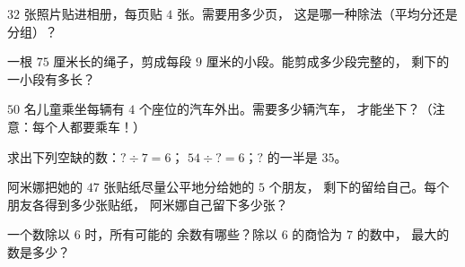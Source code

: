 \begin{exercise}[$\star$]\label{exo:g3:division:6}
$32$ 张照片贴进相册，每页贴 $4$ 张。需要用多少页，
这是哪一种除法（平均分还是分组）？
\end{exercise}

\begin{exercise}[$\star$]\label{exo:g3:division:7}
一根 $75$ 厘米长的绳子，剪成每段 $9$ 厘米的小段。能剪成多少段完整的，
剩下的一小段有多长？
\end{exercise}

\begin{exercise}[$\star$]\label{exo:g3:division:8}
$50$ 名儿童乘坐每辆有 $4$ 个座位的汽车外出。需要多少辆汽车，
才能坐下？（注意：每个人都要乘车！）
\end{exercise}

\begin{exercise}[$\star$]\label{exo:g3:division:9}
求出下列空缺的数：$? \div 7 = 6$；\quad
$54 \div ? = 6$；\quad $?$ 的一半是 $35$。
\end{exercise}

\begin{exercise}[$\star\star$]\label{exo:g3:division:10}
阿米娜把她的 $47$ 张贴纸尽量公平地分给她的 $5$ 个朋友，
剩下的留给自己。每个朋友各得到多少张贴纸，
阿米娜自己留下多少张？
\end{exercise}

\begin{exercise}[$\star\star$]\label{exo:g3:division:11}
一个数除以 $6$ 时，所有可能的
余数有哪些？除以 $6$ 的商恰为 $7$ 的数中，
最大的数是多少？
\end{exercise}
